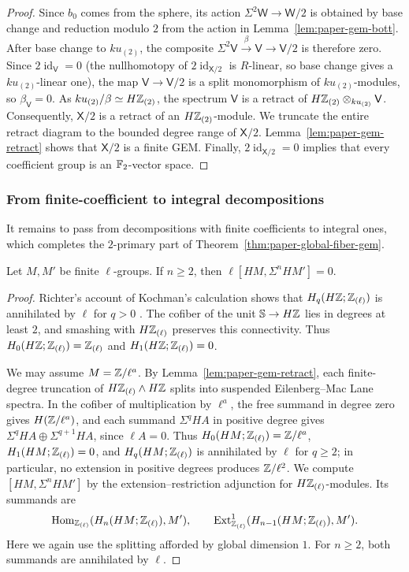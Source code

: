 \begin{proof}
Since $b_0$ comes from the sphere, its action $\Sigma^2\mathsf{W}\to\mathsf{W}/2$ is obtained by base change and reduction modulo $2$ from the action in Lemma~\ref{lem:paper-gem-bott}.
After base change to $ku_{(2)}$, the composite $\Sigma^2\mathsf{V}\xrightarrow{\beta}\mathsf{V}\to \mathsf{V}/2$ is therefore zero.
Since $2\operatorname{id}_{\mathsf{V}}=0$ (the nullhomotopy of $2\operatorname{id}_{\mathsf X/2}$ is $R$-linear, so base change gives a $ku_{(2)}$-linear one), the map $\mathsf{V}\to \mathsf{V}/2$ is a split monomorphism of $ku_{(2)}$-modules, so $\beta_{\mathsf{V}}=0$.
As $ku_{(2)}/\beta\simeq H\mathbb Z_{(2)}$, the spectrum $\mathsf{V}$ is a retract of $H\mathbb Z_{(2)}\otimes_{ku_{(2)}}\mathsf{V}$.
Consequently, $\mathsf{X}/2$ is a retract of an $H\mathbb Z_{(2)}$-module.
We truncate the entire retract diagram to the bounded degree range of $\mathsf{X}/2$.
Lemma~\ref{lem:paper-gem-retract} shows that $\mathsf{X}/2$ is a finite GEM.
Finally, $2\operatorname{id}_{\mathsf{X}/2}=0$ implies that every coefficient group is an $\mathbb F_2$-vector space.
\end{proof}

\subsubsection{From finite-coefficient to integral decompositions}
It remains to pass from decompositions with finite coefficients to integral ones, which completes the $2$-primary part of Theorem~\ref{thm:paper-global-fiber-gem}.

\begin{lemma}\label{lem:paper-gem-operations}
Let $M,M'$ be finite $\ell$-groups.
If $n\ge2$, then $\ell[HM,\Sigma^nHM']=0$.
\end{lemma}
\begin{proof}
Richter's account of Kochman's calculation shows that $H_q(H\mathbb Z;\mathbb Z_{(\ell)})$ is annihilated by $\ell$ for $q>0$ \cite[\S6.1, p.~297]{Richter2006}.
The cofiber of the unit $\mathbb S\to H\mathbb Z$ lies in degrees at least $2$, and smashing with $H\mathbb Z_{(\ell)}$ preserves this connectivity.
Thus $H_0(H\mathbb Z;\mathbb Z_{(\ell)})=\mathbb Z_{(\ell)}$ and $H_1(H\mathbb Z;\mathbb Z_{(\ell)})=0$.

We may assume $M=\mathbb Z/\ell^a$.
By Lemma~\ref{lem:paper-gem-retract}, each finite-degree truncation of $H\mathbb Z_{(\ell)}\wedge H\mathbb Z$ splits into suspended Eilenberg--Mac Lane spectra.
In the cofiber of multiplication by $\ell^a$, the free summand in degree zero gives $H(\mathbb Z/\ell^a)$, and each summand $\Sigma^qHA$ in positive degree gives $\Sigma^qHA\oplus\Sigma^{q+1}HA$, since $\ell A=0$.
Thus $H_0(HM;\mathbb Z_{(\ell)})=\mathbb Z/\ell^a$, $H_1(HM;\mathbb Z_{(\ell)})=0$, and $H_q(HM;\mathbb Z_{(\ell)})$ is annihilated by $\ell$ for $q\ge2$; in particular, no extension in positive degrees produces $\mathbb Z/\ell^2$.
We compute $[HM,\Sigma^n HM']$ by the extension--restriction adjunction for $H\mathbb Z_{(\ell)}$-modules.
Its summands are
\[
 \operatorname{Hom}_{\mathbb Z_{(\ell)}}(H_n(HM;\mathbb Z_{(\ell)}),M'),
 \qquad
 \operatorname{Ext}^1_{\mathbb Z_{(\ell)}}(H_{n-1}(HM;\mathbb Z_{(\ell)}),M').
\]
Here we again use the splitting afforded by global dimension $1$.
For $n\ge2$, both summands are annihilated by $\ell$.
\end{proof}

